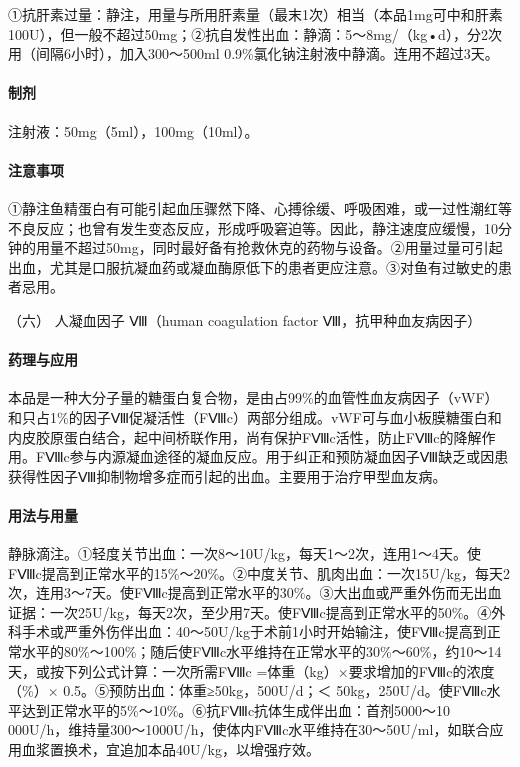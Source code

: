 ①抗肝素过量：静注，用量与所用肝素量（最末1次）相当（本品1mg可中和肝素100U），但一般不超过50mg；②抗自发性出血：静滴：5～8mg/（kg•d），分2次用（间隔6小时），加入300～500ml
0.9\%氯化钠注射液中静滴。连用不超过3天。

\paragraph{制剂}

注射液：50mg（5ml），100mg（10ml）。

\paragraph{注意事项}

①静注鱼精蛋白有可能引起血压骤然下降、心搏徐缓、呼吸困难，或一过性潮红等不良反应；也曾有发生变态反应，形成呼吸窘迫等。因此，静注速度应缓慢，10分钟的用量不超过50mg，同时最好备有抢救休克的药物与设备。②用量过量可引起出血，尤其是口服抗凝血药或凝血酶原低下的患者更应注意。③对鱼有过敏史的患者忌用。

\hypertarget{text00438.htmlux5cux23CHP17-8-1-6}{}
（六） 人凝血因子 Ⅷ（human coagulation factor Ⅷ，抗甲种血友病因子）

\paragraph{药理与应用}

本品是一种大分子量的糖蛋白复合物，是由占99\%的血管性血友病因子（vWF）和只占1\%的因子Ⅷ促凝活性（FⅧc）两部分组成。vWF可与血小板膜糖蛋白和内皮胶原蛋白结合，起中间桥联作用，尚有保护FⅧc活性，防止FⅧc的降解作用。FⅧc参与内源凝血途径的凝血反应。用于纠正和预防凝血因子Ⅷ缺乏或因患获得性因子Ⅷ抑制物增多症而引起的出血。主要用于治疗甲型血友病。

\paragraph{用法与用量}

静脉滴注。①轻度关节出血：一次8～10U/kg，每天1～2次，连用1～4天。使FⅧc提高到正常水平的15\%～20\%。②中度关节、肌肉出血：一次15U/kg，每天2次，连用3～7天。使FⅧc提高到正常水平的30\%。③大出血或严重外伤而无出血证据：一次25U/kg，每天2次，至少用7天。使FⅧc提高到正常水平的50\%。④外科手术或严重外伤伴出血：40～50U/kg于术前1小时开始输注，使FⅧc提高到正常水平的80\%～100\%；随后使FⅧc水平维持在正常水平的30\%～60\%，约10～14天，或按下列公式计算：一次所需FⅧc
=体重（kg）×要求增加的FⅧc的浓度（\%）×
0.5。⑤预防出血：体重≥50kg，500U/d；＜
50kg，250U/d。使FⅧc水平达到正常水平的5\%～10\%。⑥抗FⅧc抗体生成伴出血：首剂5000～10
000U/h，维持量300～1000U/h，使体内FⅧc水平维持在30～50U/ml，如联合应用血浆置换术，宜追加本品40U/kg，以增强疗效。

